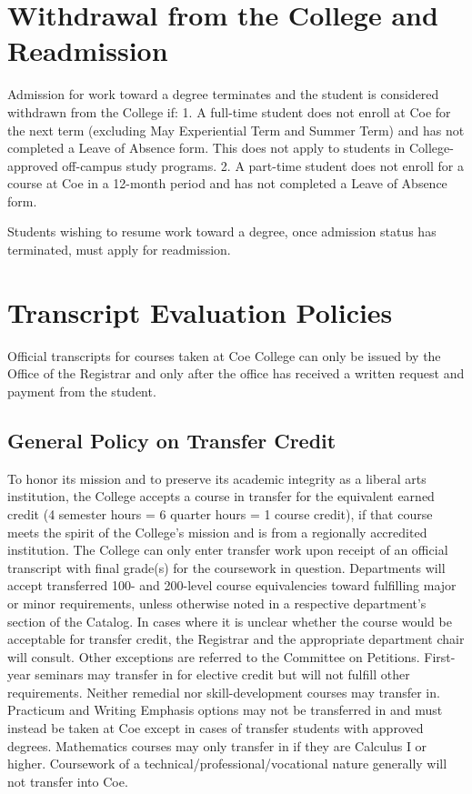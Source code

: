 \documentclass[
  letterpaper,
]{scrbook}
\begin{document}
\section{Withdrawal from the College and
Readmission}\label{withdrawal-from-the-college-and-readmission}

Admission for work toward a degree terminates and the student is
considered withdrawn from the College if: 1. A full-time student does
not enroll at Coe for the next term (excluding May Experiential Term and
Summer Term) and has not completed a Leave of Absence form. This does
not apply to students in College-approved off-campus study programs. 2.
A part-time student does not enroll for a course at Coe in a 12-month
period and has not completed a Leave of Absence form.

Students wishing to resume work toward a degree, once admission status
has terminated, must apply for readmission.

\section{Transcript Evaluation
Policies}\label{transcript-evaluation-policies}

Official transcripts for courses taken at Coe College can only be issued
by the Office of the Registrar and only after the office has received a
written request and payment from the student.

\subsection{General Policy on Transfer
Credit}\label{general-policy-on-transfer-credit}

To honor its mission and to preserve its academic integrity as a liberal
arts institution, the College accepts a course in transfer for the
equivalent earned credit (4 semester hours = 6 quarter hours = 1 course
credit), if that course meets the spirit of the College's mission and is
from a regionally accredited institution. The College can only enter
transfer work upon receipt of an official transcript with final grade(s)
for the coursework in question. Departments will accept transferred 100-
and 200-level course equivalencies toward fulfilling major or minor
requirements, unless otherwise noted in a respective department's
section of the Catalog. In cases where it is unclear whether the course
would be acceptable for transfer credit, the Registrar and the
appropriate department chair will consult. Other exceptions are referred
to the Committee on Petitions. First-year seminars may transfer in for
elective credit but will not fulfill other requirements. Neither
remedial nor skill-development courses may transfer in. Practicum and
Writing Emphasis options may not be transferred in and must instead be
taken at Coe except in cases of transfer students with approved degrees.
Mathematics courses may only transfer in if they are Calculus I or
higher. Coursework of a technical/professional/vocational nature
generally will not transfer into Coe.
\end{document}

